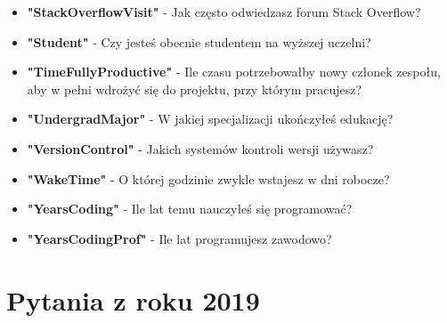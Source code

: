 \begin{appendices}
\begin{itemize}
        \item \textbf{"StackOverflowVisit"} - Jak często odwiedzasz forum Stack Overflow?
        \item \textbf{"Student"} - Czy jesteś obecnie studentem na wyższej uczelni?
        \item \textbf{"TimeFullyProductive"} - Ile czasu potrzebowałby nowy członek zespołu, aby w pełni wdrożyć się do projektu, przy którym pracujesz?
        \item \textbf{"UndergradMajor"} - W jakiej specjalizacji ukończyłeś edukację?
        \item \textbf{"VersionControl"} - Jakich systemów kontroli wersji używasz?
        \item \textbf{"WakeTime"} - O której godzinie zwykle wstajesz w dni robocze?
        \item \textbf{"YearsCoding"} - Ile lat temu nauczyłeś się programować?
        \item \textbf{"YearsCodingProf"} - Ile lat programujesz zawodowo?
    \end{itemize}


    \section{Pytania z roku 2019}\label{pytania-2019}



\end{appendices}
